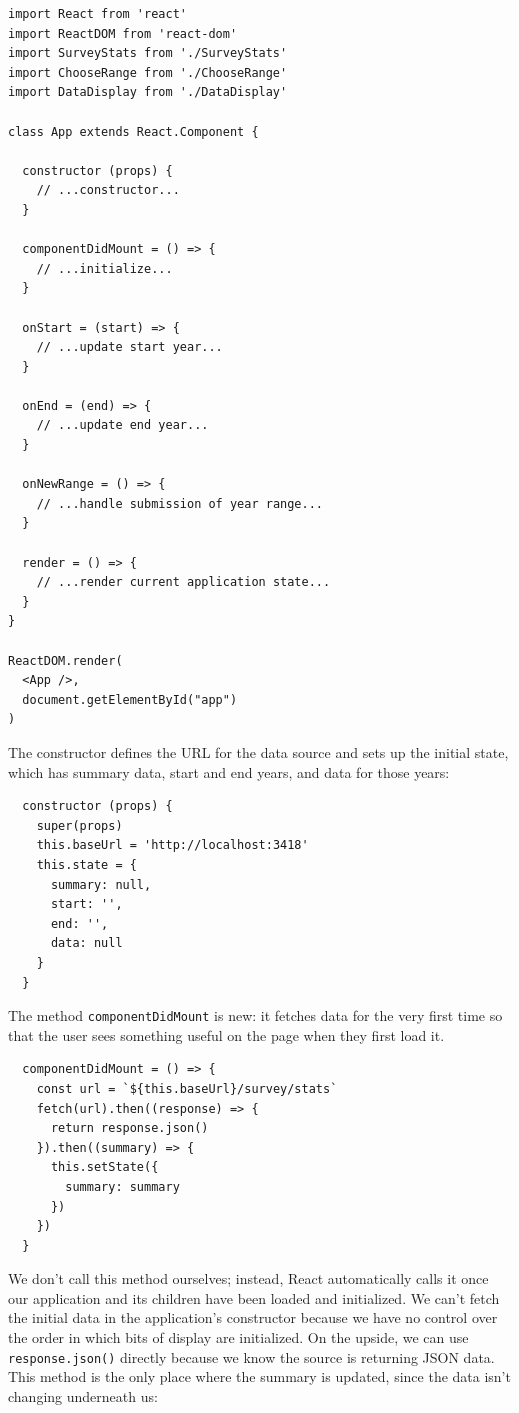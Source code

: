 \begin{verbatim}
import React from 'react'
import ReactDOM from 'react-dom'
import SurveyStats from './SurveyStats'
import ChooseRange from './ChooseRange'
import DataDisplay from './DataDisplay'

class App extends React.Component {

  constructor (props) {
    // ...constructor...
  }

  componentDidMount = () => {
    // ...initialize...
  }

  onStart = (start) => {
    // ...update start year...
  }

  onEnd = (end) => {
    // ...update end year...
  }

  onNewRange = () => {
    // ...handle submission of year range...
  }

  render = () => {
    // ...render current application state...
  }
}

ReactDOM.render(
  <App />,
  document.getElementById("app")
)
\end{verbatim}

The constructor defines the URL for the data source and sets up the
initial state, which has summary data, start and end years, and data for
those years:

\begin{verbatim}
  constructor (props) {
    super(props)
    this.baseUrl = 'http://localhost:3418'
    this.state = {
      summary: null,
      start: '',
      end: '',
      data: null
    }
  }
\end{verbatim}

The method \texttt{componentDidMount} is new: it fetches data for the
very first time so that the user sees something useful on the page when
they first load it.

\begin{verbatim}
  componentDidMount = () => {
    const url = `${this.baseUrl}/survey/stats`
    fetch(url).then((response) => {
      return response.json()
    }).then((summary) => {
      this.setState({
        summary: summary
      })
    })
  }
\end{verbatim}

We don't call this method ourselves; instead, React automatically calls
it once our application and its children have been loaded and
initialized. We can't fetch the initial data in the application's
constructor because we have no control over the order in which bits of
display are initialized. On the upside, we can use
\texttt{response.json()} directly because we know the source is
returning JSON data. This method is the only place where the summary is
updated, since the data isn't changing underneath us:

